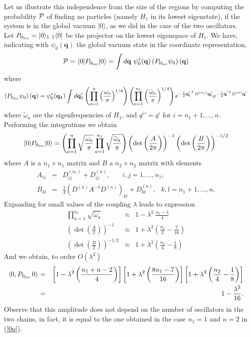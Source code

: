 \documentclass[10pt, nofootinbib]{revtex4}
\newcommand{\be}{\begin{equation}}
\newcommand{\ee}{\end{equation}}
\newcommand{\bea}{\begin{eqnarray}}
\newcommand{\eea}{\end{eqnarray}}
\begin{document}
Let us illustrate this independence from the size of the regions by
computing the probability $\cal P$ of finding no particles (namely
$H_{1}$ in its lowest eigenstate), if the system is in the global
vacuum $|0 \rangle$, as we did in the case of the two oscillators. 
Let $P_{0_{\rm loc}}=|0\rangle_{1}\ {}_{1}\langle 0|$ be the projector
on the lowest eigenspace of $H_{1}$.  We have, indicating with $\psi_0({\mathbf{q}})$ the global vacuum state in the coordinate representation,
%
 \bea
 {\cal P} = \left\langle 0 | P_{0_{\rm loc}}| 0\right\rangle = \int d 
 {\mathbf{q}} \ {\psi}_0^* ({\mathbf{q}}) \left( 
  P_{0_{\rm loc}} {\psi_0} \right)({\mathbf{q}})
 \eea
 where
 \be
  \left( 
  P_{0_{\rm loc}} {\psi_0} \right)({\mathbf{q}})= {\psi}_0^* 
 ({\mathbf{q_{1}}}) \int d\mathbf{q}_{1}' \left(\prod^{n}_{a=1} 
 \left(\frac{\omega_a}{\pi}\right)^{1/4}\right) \left(\prod^{n_{1}}_{a=1} 
 \left(\frac{\tilde{\omega}_a}{\pi}\right)^{1/4}\right) 
 e^{-\frac{1}{2}{\mathbf{q}_{1}'}^{T}
 D^{\scriptscriptstyle{(n_{1})}}{\mathbf{q}_{1}'}} 
 e^{-\frac{1}{2}{{\mathbf{q}}}^{'T} 
 D^{\scriptscriptstyle{(n)}}{{\mathbf{q}}'}} 
 \ee
 where $\tilde\omega_{a}$ are the eigenfrequencies of $H_{1}$, and ${q^i}'=q^i$ for $i=n_1+1,...,n$. 
 Performing the integrations we obtain
% 
 \be
\left\langle 0 | P_{0_{\rm loc}}| 0\right\rangle = 
 \left(\prod^{n}_{a=1} \sqrt{\frac{\omega_a}{\pi}}\prod^{n_{1}}_{a=1} 
 \sqrt{\frac{\tilde{\omega}_a}{\pi}}\right)\left(\det\left(\frac{A}{2 
 \pi}\right)\right)^{-1} \left(\det\left(\frac{B}{2 
 \pi}\right)\right)^{-1/2}
 \ee
 where $A$ is a $n_{1}\times n_{1}$ matrix and $B$ a $n_{2} \times n_{2}$ 
 matrix with elements
% 
 \bea
 A_{ij} &=& D^{\scriptscriptstyle{(n_{1})}}_{ij}+ 
 D^{\scriptscriptstyle{(n)}}_{ij}, \   \ \; \; \; \; \; 
 i,j=1,...,n_{1}; \\
 B_{kl} &=& \frac{1}{4} \left(D^{\scriptscriptstyle{(n)}} A^{-1} 
 D^{\scriptscriptstyle{(n)}}\right)_{kl} + 
 D^{\scriptscriptstyle{(n)}}_{kl}, \   \ \; k,l=n_{1}+1,...,n.
 \eea
 Expanding for small values of the coupling $\lambda$ leads to 
 expression
 \bea
 \prod^{n_{1}}_{a=1} \sqrt{\tilde\omega_a} &\approx& 1 - \lambda^2\ 
 \frac{n_{1}-1}{4} 
 \\
 \left(\det\left(\frac{A}{2 }\right)\right)^{-1} &\approx& 1 + 
 \lambda^2 \left(\frac{n_{1}}{2} - \frac{7}{16} \right) \\
 \left(\det\left(\frac{B}{2}\right)\right)^{-1/2} &\approx& 1 + 
 \lambda^2 \left(\frac{n_{2}}{4} - \frac{1}{8} \right)
 \eea
And we obtain, to order
$O(\lambda^2)$ 
%
\bea {}_{\rm }\langle 0, P_{0_{\rm loc}} \, 0\rangle_{\rm } &=&
\left[1- \lambda^2 \left(\frac{n_{1}+n-2}{4}\right)\right] \left[1+
\lambda^2 \left(\frac{8n_{1}-7}{16}\right) \right] \left[ 1 +
\lambda^2 \left(\frac{n_{2}}{4} - \frac{1}{8} \right)\right] \\
&=& 1  - \frac{\lambda^2}{16}. 
\eea
%
Observe that this amplitude does not depend on the number of
oscillators in the two chains, in fact, it is equal to the one
obtained in the case $n_1=1$ and $n=2$ in (\ref{0p}). 
\end{document}
